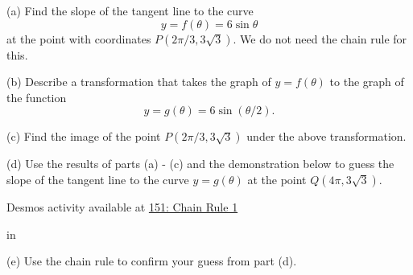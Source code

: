 \documentclass{ximera}
\newcommand{\pskip}{\vskip 0.1 in}
\begin{document}
\begin{example}  \label{Ex:CHr34rrer}
(a) Find the slope of the tangent line to the curve
\[
   y = f(\theta) = 6 \sin \theta
\]
at the point with coordinates $P(2\pi/3, 3\sqrt{3})$. We do not need the chain rule for this.

(b) Describe a transformation that takes the graph of $y=f(\theta)$ to the graph of the function
\[
        y = g(\theta) = 6\sin (\theta/2) .
\]

(c) Find the image of the point $P(2\pi/3,3\sqrt{3})$ under the above transformation.

(d) Use the results of parts (a) - (c) and the demonstration below to guess the slope of the tangent line to the curve $y=g(\theta)$ at the point $Q(4\pi,3\sqrt{3})$.

\begin{onlineOnly}
    \begin{center}
\end{center}
\end{onlineOnly}

Desmos activity available at \href{https://www.desmos.com/calculator/mqjxpsqyo5}{151: Chain Rule 1}

\pskip

(e) Use the chain rule to confirm your guess from part (d).

\end{example}
\end{document}

